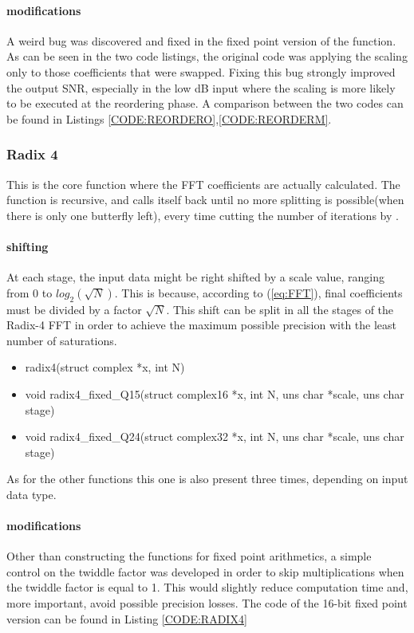 \documentclass[a4paper]{article}
\begin{document}
	\paragraph{modifications}
	A weird bug was discovered and fixed in the fixed point version of the function. As can be seen in the two code listings, the original code was applying the scaling only to those coefficients that were swapped. Fixing this bug strongly improved the output SNR, especially in the low dB input where the scaling is more likely to be executed at the reordering phase.
	A comparison between the two codes can be found in Listings \ref{CODE:REORDERO},\ref{CODE:REORDERM}.


\subsubsection{Radix 4}
\label{SUB:Radix4}
This is the core function where the FFT coefficients are actually calculated. The function is recursive, and calls itself back until no more splitting is possible(when there is only one butterfly left), every time cutting the number of iterations by .
\paragraph{shifting}
At each stage, the input data might be right shifted by a scale value, ranging from 0 to $log_2(\sqrt{N})$. This is because, according to (\ref{eq:FFT}), final coefficients must be divided by a factor $\sqrt{N}$. This shift can be split in all the stages of the Radix-4 FFT in order to achieve the maximum possible precision with the least number of saturations.
\begin{itemize}
	\item radix4(struct complex *x, int N)
	\item void radix4\_fixed\_Q15(struct complex16 *x, int N, uns char *scale, uns char stage)
	\item void radix4\_fixed\_Q24(struct complex32 *x, int N, uns char *scale, uns char stage)
\end{itemize}
As for the other functions this one is also present three times, depending on input data type.
\paragraph{modifications}
Other than constructing the functions for fixed point arithmetics, a simple control on the twiddle factor was developed in order to skip multiplications when the twiddle factor is equal to 1. This would slightly reduce computation time and, more important, avoid possible precision losses.
The code of the 16-bit fixed point version can be found in Listing \ref{CODE:RADIX4}
\end{document}
